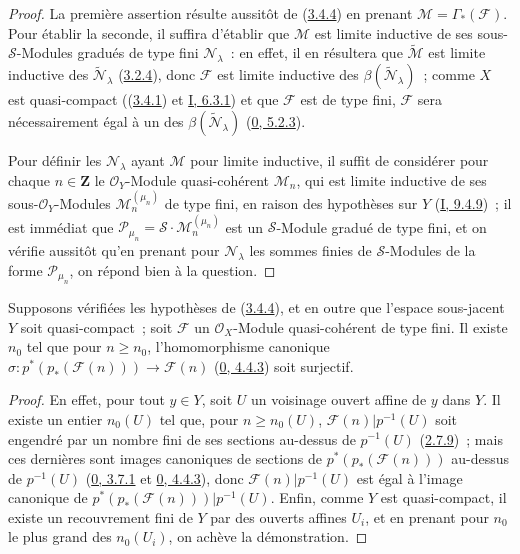 \begin{proof}
La première assertion résulte aussitôt de
(\hyperref[II.3.4.4-fr]{3.4.4}) en prenant
$\mathcal{M}=\Gamma_*(\mathcal{F})$. Pour établir la seconde, il suffira
d'établir que $\mathcal{M}$ est limite inductive de ses sous-$\mathcal{S}$-Modules
gradués de type fini $\mathcal{N}_\lambda$~: en effet, il en résultera que
$\widetilde{\mathcal{M}}$ est limite inductive des
$\widetilde{\mathcal{N}}_\lambda$
(\hyperref[II.3.2.4-fr]{3.2.4}), donc $\mathcal{F}$ est limite inductive des
$\beta(\widetilde{\mathcal{N}}_\lambda)$~; comme $X$ est quasi-compact
((\hyperref[II.3.4.1-fr]{3.4.1}) et
\hyperref[I.6.3.1-fr]{I, 6.3.1}) et que $\mathcal{F}$ est de type fini,
$\mathcal{F}$ sera nécessairement égal à un des
$\beta(\widetilde{\mathcal{N}}_\lambda)$
(\hyperref[0.5.2.3-fr]{0, 5.2.3}).

Pour définir les $\mathcal{N}_\lambda$ ayant $\mathcal{M}$ pour limite
inductive, il suffit de considérer pour chaque $n\in\mathbf{Z}$ le
$\mathcal{O}_Y$-Module quasi-cohérent $\mathcal{M}_n$, qui est limite
inductive de ses sous-$\mathcal{O}_Y$-Modules
$\mathcal{M}_n^{(\mu_n)}$ de type fini, en raison des hypothèses sur $Y$
(\hyperref[I.9.4.9-fr]{I, 9.4.9})~; il est immédiat que
$\mathcal{P}_{\mu_n}=\mathcal{S}\cdot\mathcal{M}_n^{(\mu_n)}$ est un
$\mathcal{S}$-Module gradué de type fini, et on vérifie aussitôt qu'en prenant
pour $\mathcal{N}_\lambda$ les sommes finies de $\mathcal{S}$-Modules de la
forme $\mathcal{P}_{\mu_n}$, on répond bien à la question.
\end{proof}

\begin{corollary}[3.4.6]
\label{II.3.4.6-fr}
Supposons vérifiées les hypothèses de (\hyperref[II.3.4.4-fr]{3.4.4}), et en
outre que l'espace sous-jacent $Y$ soit quasi-compact~; soit $\mathcal{F}$ un
$\mathcal{O}_X$-Module quasi-cohérent de type fini. Il existe $n_0$ tel que
pour $n\geq n_0$, l'homomorphisme canonique
$\sigma:p^*(p_*(\mathcal{F}(n)))\to\mathcal{F}(n)$
(\hyperref[0.4.4.3-fr]{0, 4.4.3}) soit surjectif.
\end{corollary}

\begin{proof}
En effet, pour tout $y\in Y$, soit $U$ un voisinage ouvert affine de $y$ dans
$Y$. Il existe un entier $n_0(U)$ tel que, pour $n\geq n_0(U)$,
$\mathcal{F}(n)|p^{-1}(U)$ soit engendré par un nombre fini de ses sections
au-dessus de $p^{-1}(U)$ (\hyperref[II.2.7.9-fr]{2.7.9})~; mais ces dernières
sont images canoniques de sections de $p^*(p_*(\mathcal{F}(n)))$ au-dessus de
$p^{-1}(U)$ (\hyperref[0.3.7.1-fr]{0, 3.7.1} et
\hyperref[0.4.4.3-fr]{0, 4.4.3}), donc
$\mathcal{F}(n)|p^{-1}(U)$ est égal à l'image canonique de
$p^*(p_*(\mathcal{F}(n)))|p^{-1}(U)$. Enfin, comme $Y$ est quasi-compact, il
existe un recouvrement fini de $Y$ par des ouverts affines $U_i$, et en
prenant pour $n_0$ le plus grand des $n_0(U_i)$, on achève la démonstration.
\end{proof}

